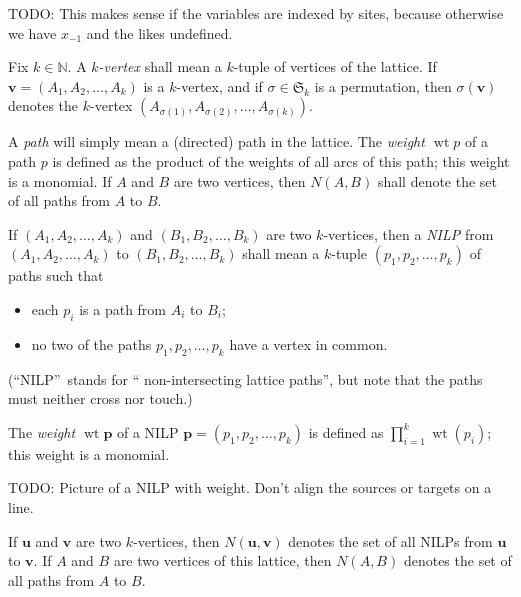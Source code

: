 \documentclass[reqno]{amsart}%
\newcommand{\0}{\phantom{c}}
\let\prodnonlimits\prod
\renewcommand{\prod}{\prodnonlimits\limits}
\newcommand{\defn}[1]{{\color{darkred}\emph{#1}}}
\theoremstyle{plain}
\theoremstyle{definition}
\numberwithin{equation}{section}
\begin{document}
TODO: This makes sense if the variables are indexed by sites, because
otherwise we have $x_{-1}$ and the likes undefined.

Fix $k\in\mathbb{N}$. A \defn{$k$-vertex} shall mean a $k$-tuple of vertices
of the lattice. If $\mathbf{v}=\left(  A_{1},A_{2},\ldots,A_{k}\right)  $ is a
$k$-vertex, and if $\sigma\in\mathfrak{S}_{k}$ is a permutation, then
$\sigma\left(  \mathbf{v}\right)  $ denotes the $k$-vertex $\left(
A_{\sigma\left(  1\right)  },A_{\sigma\left(  2\right)  },\ldots
,A_{\sigma\left(  k\right)  }\right)  $.

A \defn{path} will simply mean a (directed) path in the lattice. The
\defn{weight $\operatorname{wt}p$} of a path $p$ is defined as the product of
the weights of all arcs of this path; this weight is a monomial. If $A$ and
$B$ are two vertices, then \defn{$N\left(  A,B\right)  $} shall denote the set
of all paths from $A$ to $B$.

If $\left(  A_{1},A_{2},\ldots,A_{k}\right)  $ and $\left(  B_{1},B_{2}%
,\ldots,B_{k}\right)  $ are two $k$-vertices, then a \defn{NILP} from $\left(
A_{1},A_{2},\ldots,A_{k}\right)  $ to $\left(  B_{1},B_{2},\ldots
,B_{k}\right)  $ shall mean a $k$-tuple $\left(  p_{1},p_{2},\ldots
,p_{k}\right)  $ of paths such that

\begin{itemize}
\item each $p_{i}$ is a path from $A_{i}$ to $B_{i}$;

\item no two of the paths $p_{1},p_{2},\ldots,p_{k}$ have a vertex in common.
\end{itemize}

(\textquotedblleft NILP\textquotedblright\ stands for \textquotedblleft
non-intersecting lattice paths\textquotedblright, but note that the paths must
neither cross nor touch.)

The \defn{weight $\operatorname{wt}\mathbf{p}$} of a NILP $\mathbf{p}=\left(
p_{1},p_{2},\ldots,p_{k}\right)  $ is defined as $\prod_{i=1}^{k}%
\operatorname*{wt}\left(  p_{i}\right)  $; this weight is a monomial.

TODO: Picture of a NILP with weight. Don't align the sources or targets on a line.

If $\mathbf{u}$ and $\mathbf{v}$ are two $k$-vertices, then
\defn{$N\left( \mathbf{u},\mathbf{v}\right)  $} denotes the set of all NILPs
from $\mathbf{u}$ to $\mathbf{v}$. If $A$ and $B$ are two vertices of this
lattice, then \defn{$N\left( A, B \right)  $} denotes the set of all paths
from $A$ to $B$.
\end{document}
